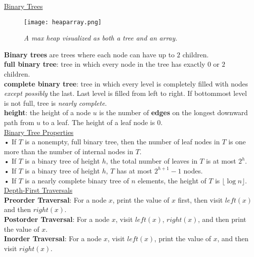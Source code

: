 \documentclass[12pt, fleqn]{general}
\begin{document}
\begin{multicols*}{2}
    \newpage
    
    {\large \underline{Binary Trees}}\\

    \begin{figure*}[t]
        \centering
        \texttt{[image: heaparray.png]}
        \caption*{\emph{A max heap visualized as both a tree and an array.}}
    \end{figure*}

    \textbf{Binary trees} are trees where each node can have up to $2$ children.\\

    \textbf{full binary tree}: tree in which every node in the tree has exactly $0$ or $2$ children.\\

    \textbf{complete binary tree}: tree in which every level is completely filled with nodes \emph{except possibly} the last. Last level is filled from left to right. If bottommost level is not full, tree is \emph{nearly complete}.\\

    \textbf{height}: the height of a node $u$ is the number of \textbf{edges} on the longest downward path from $u$ to a leaf. The height of a leaf node is $0$.\\

    \underline{Binary Tree Properties}\\

    • If $T$ is a nonempty, full binary tree, then the number of leaf nodes in $T$ is one more than the number of internal nodes in $T$.\\
    • If $T$ is a binary tree of height $h$, the total number of leaves in $T$ is at most $2^h$.\\
    • If $T$ is a binary tree of height $h$, $T$ has at most $2^{h+1} - 1$ nodes.\\
    • If $T$ is a nearly complete binary tree of $n$ elements, the height of $T$ is $\lfloor \log n \rfloor$.\\

    \underline{Depth-First Traversals}\\

    \textbf{Preorder Traversal}: For a node $x$, print the value of $x$ first, then visit $left(x)$ and then $right(x)$.\\
    \textbf{Postorder Traversal}: For a node $x$, visit $left(x)$, $right(x)$, and then print the value of $x$.\\
    \textbf{Inorder Traversal}: For a node $x$, visit $left(x)$, print the value of $x$, and then visit $right(x)$.\\


\end{multicols*}
\end{document}
